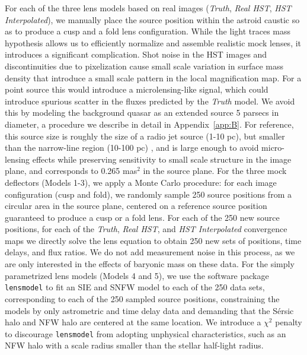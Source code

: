For each of the three lens models based on real images (\textit{Truth}, \textit{Real HST}, \textit{HST Interpolated}), we manually place the source position within the astroid caustic so as to produce a cusp and a fold lens configuration. While the light traces mass hypothesis allows us to efficiently normalize and assemble realistic mock lenses, it introduces a significant complication. Shot noise in the HST images and discontinuities due to pixelization cause small scale variation in surface mass density that introduce a small scale pattern in the local magnification map. For a point source this would introduce a microlensing-like signal, which could introduce spurious scatter in the fluxes predicted by the \textit{Truth} model. We avoid this by modeling the background quasar as an extended source 5 parsecs in diameter, a procedure we describe in detail in Appendix~\ref{app:B}. For reference, this source size is roughly the size of a radio jet source (1-10 pc), but smaller than the narrow-line region (10-100 pc) \cite{M+M03}, and is large enough to avoid micro-lensing effects while preserving sensitivity to small scale structure in the image plane, and corresponds to 0.265 mas$^2$ in the source plane.
\newline \indent For the three mock deflectors (Models 1-3), we apply a Monte Carlo procedure: for each image configuration (cusp and fold), we randomly sample 250 source positions from a circular area in the source plane, centered on a reference source position guaranteed to produce a cusp or a fold lens. For each of the 250 new source positions, for each of the \textit{Truth}, \textit{Real HST}, and \textit{HST Interpolated} convergence maps we directly solve the lens equation to obtain 250 new sets of positions, time delays, and flux ratios. We do not add measurement noise in this process, as we are only interested in the effects of baryonic mass on these data. 
\newline \indent For the simply parametrized lens models (Models 4 and 5), we use the software package {\tt{lensmodel}} to fit an SIE and SNFW model to each of the 250 data sets, corresponding to each of the 250 sampled source positions, constraining the models by only astrometric and time delay data and demanding that the S{\'e}rsic halo and NFW halo are centered at the same location. We introduce a $\chi^2$ penalty to discourage {\tt{lensmodel}} from adopting unphysical characteristics, such as an NFW halo with a scale radius smaller than the stellar half-light radius.
